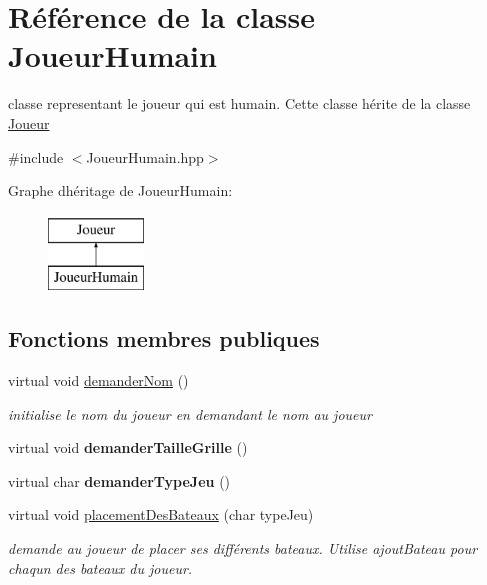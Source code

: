 \hypertarget{class_joueur_humain}{}\section{Référence de la classe Joueur\+Humain}
\label{class_joueur_humain}


classe representant le joueur qui est humain. Cette classe hérite de la classe \hyperlink{class_joueur}{Joueur}  




{\ttfamily \#include $<$Joueur\+Humain.\+hpp$>$}

Graphe d\textquotesingle{}héritage de Joueur\+Humain\+:\begin{figure}[H]
\begin{center}
\leavevmode
\includegraphics[height=2.000000cm]{class_joueur_humain}
\end{center}
\end{figure}
\subsection*{Fonctions membres publiques}
\begin{DoxyCompactItemize}
\item 
virtual void \hyperlink{class_joueur_humain_afde5ace70d8664257e7774beea718120}{demander\+Nom} ()\hypertarget{class_joueur_humain_afde5ace70d8664257e7774beea718120}{}\label{class_joueur_humain_afde5ace70d8664257e7774beea718120}

\begin{DoxyCompactList}\small\item\em initialise le nom du joueur en demandant le nom au joueur \end{DoxyCompactList}\item 
virtual void {\bfseries demander\+Taille\+Grille} ()\hypertarget{class_joueur_humain_aecd25abe7629ee3925004e2f0bcb7c7e}{}\label{class_joueur_humain_aecd25abe7629ee3925004e2f0bcb7c7e}

\item 
virtual char {\bfseries demander\+Type\+Jeu} ()\hypertarget{class_joueur_humain_a63677d4f1eb52cfa30d932a78098aee7}{}\label{class_joueur_humain_a63677d4f1eb52cfa30d932a78098aee7}

\item 
virtual void \hyperlink{class_joueur_humain_a31e23d1e076b0e6110e0a9d354d80674}{placement\+Des\+Bateaux} (char type\+Jeu)
\begin{DoxyCompactList}\small\item\em demande au joueur de placer ses différents bateaux. Utilise ajout\+Bateau pour chaqun des bateaux du joueur. \end{DoxyCompactList}\end{DoxyCompactItemize}
